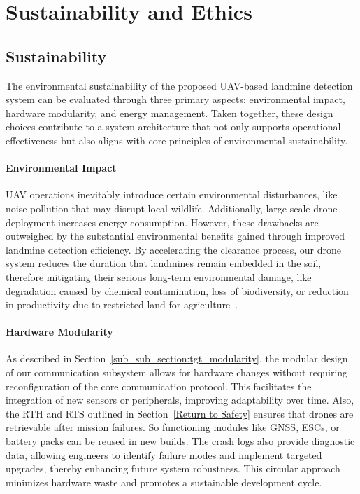 \newpage
{}
\setlength{\parindent}{0pt}

\section{Sustainability and Ethics} \label{sustainability_ethics}


\subsection{Sustainability}\label{sustainability}

The environmental sustainability of the proposed \gls{UAV}-based landmine detection system can be evaluated through three primary aspects: environmental impact, hardware modularity, and energy management. Taken together, these design choices contribute to a system architecture that not only supports operational effectiveness but also aligns with core principles of environmental sustainability.

\paragraph{Environmental Impact}

\gls{UAV} operations inevitably introduce certain environmental disturbances, like noise pollution that may disrupt local wildlife. Additionally, large-scale drone deployment increases energy consumption. However, these drawbacks are outweighed by the substantial environmental benefits gained through improved landmine detection efficiency. By accelerating the clearance process, our drone system reduces the duration that landmines remain embedded in the soil, therefore mitigating their serious long-term environmental damage, like degradation caused by chemical contamination, loss of biodiversity, or reduction in productivity due to restricted land for agriculture~\cite{eniang2007impacts}.

\paragraph{Hardware Modularity}

As described in Section~\ref{sub_sub_section:tgt_modularity}, the modular design of our communication subsystem allows for hardware changes without requiring reconfiguration of the core communication protocol. This facilitates the integration of new sensors or peripherals, improving adaptability over time. Also, the \gls{RTH} and \gls{RTS} outlined in Section~\ref{Return to Safety} ensures that drones are retrievable after mission failures. So functioning modules like GNSS, ESCs, or battery packs can be reused in new builds. The crash logs also provide diagnostic data, allowing engineers to identify failure modes and implement targeted upgrades, thereby enhancing future system robustness. This circular approach minimizes hardware waste and promotes a sustainable development cycle.

